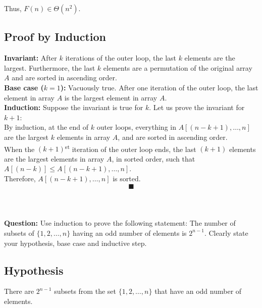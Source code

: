 \documentclass[a4paper,12pt]{article}
\begin{document}
Thus,  $F(n) \in \Theta(n^2)$.\\

\subsection{Proof by Induction}

\textbf{Invariant:} After $k$ iterations of the outer loop, the last $k$ elements are the largest. Furthermore, the last $k$ elements are a permutation of the original array $A$ and are sorted in ascending order.\\

\textbf{Base case ($k=1$):} Vacuously true. After one iteration of the outer loop, the last element in array $A$ is the largest element in array $A$.\\

\textbf{Induction:} Suppose the invariant is true for $k$. Let us prove the invariant for $k+1$:\\

By induction, at the end of $k$ outer loops, everything in $A[(n-k+1), \ldots, n]$ are the largest $k$ elements in array $A$, and are sorted in ascending order.\\

When the $(k+1)$\textsuperscript{st} iteration of the outer loop ends, the last $(k+1)$ elements are the largest elements in array $A$, in sorted order, such that $A[(n-k)] \leq A[(n-k+1), \ldots, n]$.\\

Therefore, $A[(n-k+1), \ldots, n]$ is sorted.\\

$$\blacksquare$$\\

\section{}

\textbf{Question:} Use induction to prove the following statement: The number of subsets of $\{1, 2, \ldots, n\}$ having an odd number of elements is $2^{n-1}$. Clearly state your hypothesis, base case and inductive step.\\

\subsection{Hypothesis}

 There are $2^{n-1}$ subsets from the set $\{1, 2, \ldots, n\}$ that have an odd number of elements.\\
\end{document}
